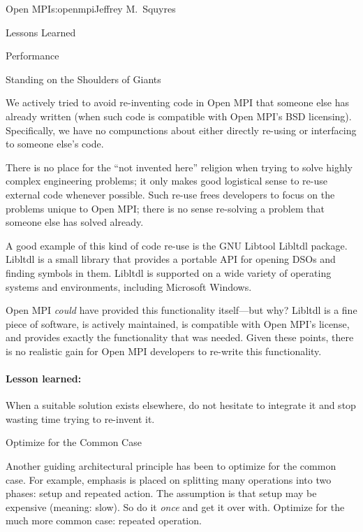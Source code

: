 \begin{aosachapter}{Open MPI}{s:openmpi}{Jeffrey M.\ Squyres}
\begin{aosasect1}{Lessons Learned}
\begin{aosasect2}{Performance}
\end{aosasect2}


\begin{aosasect2}{Standing on the Shoulders of Giants}

We actively tried to avoid re-inventing code in Open MPI that someone
else has already written (when such code is compatible with Open
MPI's BSD licensing).
%
Specifically, we have no compunctions about either directly re-using
or interfacing to someone else's code.

There is no place for the ``not invented here'' religion when trying
to solve highly complex engineering problems; it only makes good
logistical sense to re-use external code whenever possible.
%
Such re-use frees developers to focus on the problems unique to Open
MPI; there is no sense re-solving a problem that someone else has
solved already.

A good example of this kind of code re-use is the GNU Libtool Libltdl
package.  Libltdl is a small library that provides a portable API for
opening DSOs and finding symbols in them.  Libltdl is supported on a
wide variety of operating systems and environments, including
Microsoft Windows.

Open MPI \emph{could} have provided this functionality itself---but
why?
%
Libltdl is a fine piece of software, is actively maintained, is
compatible with Open MPI's license, and provides exactly the
functionality that was needed.
%
Given these points, there is no realistic gain for Open MPI developers
to re-write this functionality.


\paragraph{Lesson learned:} 

When a suitable solution exists elsewhere, do not hesitate to integrate
it and stop wasting time trying to re-invent it.

\end{aosasect2}


\begin{aosasect2}{Optimize for the Common Case}

Another guiding architectural principle has been to optimize for the
common case.  
% 
For example, emphasis is placed on splitting many operations into two
phases: setup and repeated action.  The assumption is that setup may
be expensive (meaning: slow).  So do it \emph{once} and get it over
with.
%
Optimize for the much more common case: repeated operation.


\end{aosasect2}
\end{aosasect1}
\end{aosachapter}
